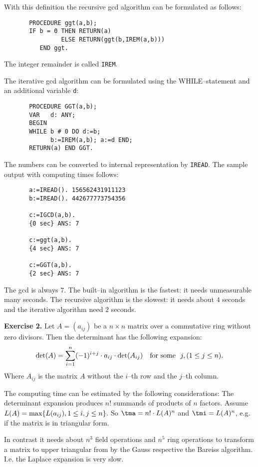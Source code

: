 With this definition the
recursive gcd algorithm can be formulated as follows:
\begin{verbatim}
       PROCEDURE ggt(a,b);
       IF b = 0 THEN RETURN(a) 
                ELSE RETURN(ggt(b,IREM(a,b))) 
          END ggt.
\end{verbatim}
The integer remainder is called \verb/IREM/.

The iterative gcd algorithm can be formulated 
using the WHILE--statement and an additional variable 
\verb/d/:
\begin{verbatim}
       PROCEDURE GGT(a,b);
       VAR   d: ANY;
       BEGIN 
       WHILE b # 0 DO d:=b; 
             b:=IREM(a,b); a:=d END;
       RETURN(a) END GGT.
\end{verbatim}

The numbers can be converted to internal representation by \verb/IREAD/.
The sample output with computing times follows:
\begin{verbatim}
       a:=IREAD(). 156562431911123 
       b:=IREAD(). 442677773754356 

       c:=IGCD(a,b).
       {0 sec} ANS: 7

       c:=ggt(a,b).
       {4 sec} ANS: 7

       c:=GGT(a,b).
       {2 sec} ANS: 7
\end{verbatim}
The gcd is always $7$. The built--in algorithm is 
the fastest: it needs unmeasurable many seconds.
The recursive algorithm is the slowest: it needs 
about $4$ seconds and the iterative algorithm 
need $2$ seconds. 


{\bf Exercise 2.} 
Let $A = ( a_{ij} )$ be a $n \times n$ matrix over 
a commutative ring without zero divisors.
Then the determinant has the following expansion:
\begin{displaymath}  
       {\rm det}(A) = \sum_{i=1}^{n} (-1)^{i+j} \cdot a_{ij} \cdot
                                     {\rm det}(A_{ij})
       \ \ \ \mbox{\rm for some} \ \  j, (1 \leq j \leq n).
\end{displaymath}
Where $A_{ij}$ is the matrix $A$ without the $i$--th row
and the $j$--th column. 

The computing time can be estimated by the following 
considerations:
The determinant expansion produces $n !$ summands of products
of $n$ factors. 
Assume $L(A) = {\rm max}\{ L(a_{ij}), 1 \leq i, j \leq n \}$.
So $\tma = n ! \cdot L(A)^n$ and 
$\tmi = L(A)^n$, e.g. if the matrix is in triangular form.

In contrast it needs about $n^3$ field operations 
and $n^5$ ring operations 
to transform a matrix to upper triangular from by the 
Gauss respective the Bareiss algorithm.
I.e. the Laplace expansion is very slow.

